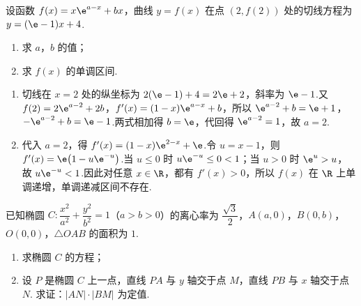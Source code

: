 \begin{problem}
设函数 \(f(x)=x\e^{a-x}+bx\)，曲线 \(y=f(x)\) 在点 \((2,f(2))\) 处的切线方程为 \(y=(\e-1)x+4\).

\begin{enumerate}
\item 求 \(a\)，\(b\) 的值；
\item 求 \(f(x)\) 的单调区间.
\end{enumerate}
\end{problem}

\begin{solution}
\begin{enumerate}
\item 切线在 \(x=2\) 处的纵坐标为 \(2(\e-1)+4=2\e+2\)，斜率为 \(\e-1\).又
\(f(2)=2\e^{a-2}+2b\)，\(f'(x)=(1-x)\e^{a-x}+b\)，所以
\(\e^{a-2}+b=\e+1\)，\(-\e^{a-2}+b=\e-1\).两式相加得 \(b=\e\)，代回得 \(\e^{a-2}=1\)，故 \(a=2\).
\item 代入 \(a=2\)，得 \(f'(x)=(1-x)\e^{2-x}+\e\).令 \(u=x-1\)，则
\(f'(x)=\e\bigl(1-u\e^{-u}\bigr)\).当 \(u\le0\) 时 \(u\e^{-u}\le0<1\)；当 \(u>0\) 时 \(\e^u>u\)，故 \(u\e^{-u}<1\).因此对任意 \(x\in\R\)，都有 \(f'(x)>0\)，所以 \(f(x)\) 在 \(\R\) 上单调递增，单调递减区间不存在.
\end{enumerate}
\end{solution}

\begin{problem}
已知椭圆 \(C:\dfrac{x^2}{a^2}+\dfrac{y^2}{b^2}=1\)（\(a>b>0\)）的离心率为 \(\dfrac{\sqrt3}{2}\)，\(A(a,0)\)，\(B(0,b)\)，\(O(0,0)\)，\(\triangle OAB\) 的面积为 \(1\).

\begin{enumerate}
\item 求椭圆 \(C\) 的方程；
\item 设 \(P\) 是椭圆 \(C\) 上一点，直线 \(PA\) 与 \(y\) 轴交于点 \(M\)，直线 \(PB\) 与 \(x\) 轴交于点 \(N\). 求证：\(|AN|\cdot|BM|\) 为定值.
\end{enumerate}

\begingroup
{}
\endgroup
\end{problem}

